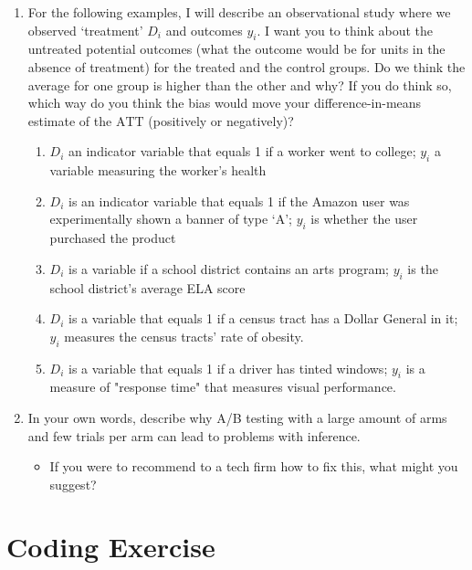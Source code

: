 \documentclass[12pt]{article}
\begin{document}
\begin{enumerate}
  \item For the following examples, I will describe an observational study where we observed `treatment' $D_i$ and outcomes $y_i$. I want you to think about the untreated potential outcomes (what the outcome would be for units in the absence of treatment) for the treated and the control groups. Do we think the average for one group is higher than the other and why? If you do think so, which way do you think the bias would move your difference-in-means estimate of the $\text{ATT}$ (positively or negatively)?
  \begin{enumerate}
    \item $D_i$ an indicator variable that equals 1 if a worker went to college; $y_i$ a variable measuring the worker's health
    
    \item $D_i$ is an indicator variable that equals 1 if the Amazon user was experimentally shown a banner of type `A'; $y_i$ is whether the user purchased the product
    
    \item $D_i$ is a variable if a school district contains an arts program; $y_i$ is the school district's average ELA score
    
    \item $D_i$ is a variable that equals 1 if a census tract has a Dollar General in it; $y_i$ measures the census tracts' rate of obesity.
    
    \item $D_i$ is a variable that equals 1 if a driver has tinted windows; $y_i$ is a measure of "response time" that measures visual performance.
  \end{enumerate}

  \item In your own words, describe why A/B testing with a large amount of arms and few trials per arm can lead to problems with inference.
  \begin{itemize}
    \item If you were to recommend to a tech firm how to fix this, what might you suggest?
  \end{itemize}
\end{enumerate}


\newpage 
\section*{Coding Exercise}
\end{document}
